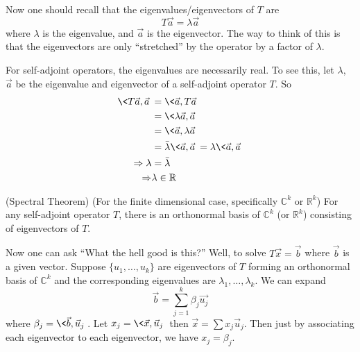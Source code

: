 Now one should recall that the eigenvalues/eigenvectors of
$T$ are
\begin{equation}
T\vec{a}=\lambda\vec{a}
\end{equation}
where $\lambda$ is the eigenvalue, and $\vec{a}$ is the
eigenvector. The way to think of this is that the
eigenvectors are only ``stretched'' by the operator by a
factor of $\lambda$.

For self-adjoint operators, the eigenvalues are necessarily
real. To see this, let
$\lambda$, $\vec{a}$ be the eigenvalue and eigenvector of a
self-adjoint operator $T$. So
\begin{align*}
\<T\vec{a},\vec{a}\> &= \<\vec{a},T\vec{a}\> \\
&= \<\lambda\vec{a},\vec{a}\>\\
&= \<\vec{a},\lambda\vec{a}\>\\
&= \bar{\lambda}\<\vec{a},\vec{a}\> =
\lambda\<\vec{a},\vec{a}\>\\
\Rightarrow \lambda &=\bar{\lambda}\\
\Rightarrow &\lambda\in\mathbb{R}
\end{align*}
\begin{thm}{(Spectral Theorem)}
(For the finite dimensional case, specifically
  $\mathbb{C}^k$ or $\mathbb{R}^k$) For any self-adjoint
  operator $T$, there is an orthonormal basis of
  $\mathbb{C}^k$ (or $\mathbb{R}^k$) consisting of
  eigenvectors of $T$.
\end{thm}

Now one can ask ``What the hell good is this?'' Well, to
solve $T\vec{x}=\vec{b}$ where $\vec{b}$ is a given
vector. Suppose $\{u_1,\ldots,u_k\}$ are eigenvectors of $T$
forming an orthonormal basis of $\mathbb{C}^k$ and the
corresponding eigenvalues are
$\lambda_1,\ldots,\lambda_k$. We can expand
\begin{equation}
\vec{b}=\sum^{k}_{j=1}\beta_{j}\vec{u_{j}}
\end{equation}
where $\beta_{j}=\<\vec{b},\vec{u}_j\>$. Let $x_j =
\<\vec{x},\vec{u}_j\>$ then $\vec{x}=\sum
x_{j}\vec{u}_{j}$. Then just by associating each eigenvector
to each eigenvector, we have $x_j=\beta_j$.
